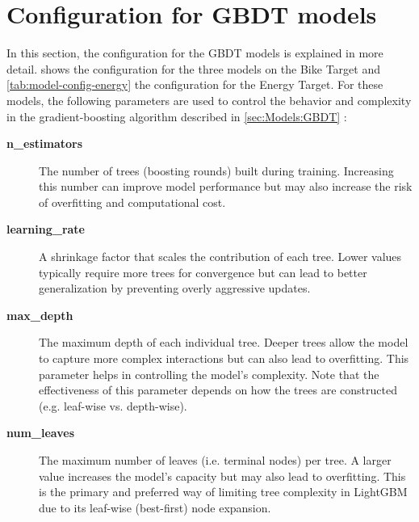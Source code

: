 \section{Configuration for GBDT models}
\label{appendix:GBDT-configs}

In this section, the configuration for the GBDT models is explained in more detail.  shows the configuration for the three models on the Bike Target and \cref{tab:model-config-energy} the configuration for the Energy Target. For these models, the following parameters are used to control the behavior and complexity in the gradient-boosting algorithm described in \cref{sec:Models:GBDT} \parencite[1941--1943]{bentejac_comparative_2021}: 

\begin{description}
  \item[\textbf{n\_estimators}] The number of trees (boosting rounds) built during training. Increasing this number can improve model performance but may also increase the risk of overfitting and computational cost.
  
  \item[\textbf{learning\_rate}] A shrinkage factor that scales the contribution of each tree. Lower values typically require more trees for convergence but can lead to better generalization by preventing overly aggressive updates.
  
  \item[\textbf{max\_depth}] The maximum depth of each individual tree. Deeper trees allow the model to capture more complex interactions but can also lead to overfitting. This parameter helps in controlling the model’s complexity. Note that the effectiveness of this parameter depends on how the trees are constructed (e.g. leaf-wise vs. depth-wise).

  \item[\textbf{num\_leaves}] The maximum number of leaves (i.e. terminal nodes) per tree. A larger value increases the model’s capacity but may also lead to overfitting. This is the primary and preferred way of limiting tree complexity in LightGBM due to its leaf-wise (best-first) node expansion.
  
  

\end{description}

